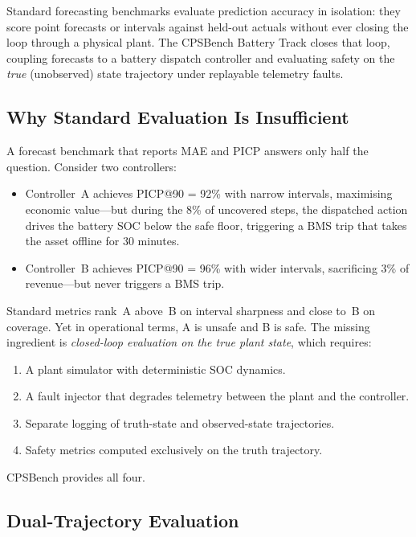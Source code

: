 Standard forecasting benchmarks evaluate prediction accuracy in isolation:
they score point forecasts or intervals against held-out actuals without
ever closing the loop through a physical plant.  The CPSBench Battery Track
closes that loop, coupling forecasts to a battery dispatch controller and
evaluating safety on the \emph{true} (unobserved) state trajectory under
replayable telemetry faults.

\subsection{Why Standard Evaluation Is Insufficient}

A forecast benchmark that reports MAE and PICP answers only half the
question.  Consider two controllers:

\begin{itemize}
  \item Controller~A achieves PICP@90 = 92\% with narrow intervals,
    maximising economic value---but during the 8\% of uncovered steps,
    the dispatched action drives the battery SOC below the safe floor,
    triggering a BMS trip that takes the asset offline for 30 minutes.
  \item Controller~B achieves PICP@90 = 96\% with wider intervals,
    sacrificing 3\% of revenue---but never triggers a BMS trip.
\end{itemize}

Standard metrics rank~A above~B on interval sharpness and close to~B on
coverage.  Yet in operational terms, A is unsafe and B is safe.  The
missing ingredient is \emph{closed-loop evaluation on the true plant
state}, which requires:
\begin{enumerate}
  \item A plant simulator with deterministic SOC dynamics.
  \item A fault injector that degrades telemetry between the plant and the
    controller.
  \item Separate logging of truth-state and observed-state trajectories.
  \item Safety metrics computed exclusively on the truth trajectory.
\end{enumerate}

CPSBench provides all four.

\subsection{Dual-Trajectory Evaluation}

